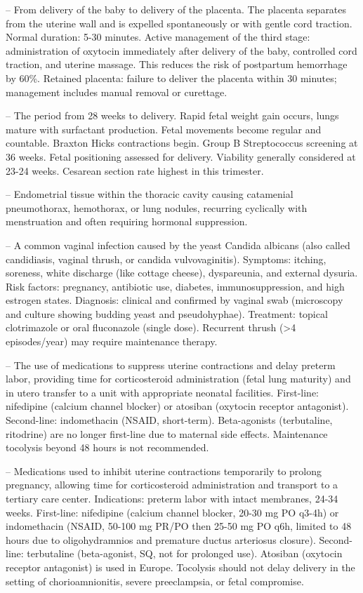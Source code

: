 -- From delivery of the baby to delivery of the placenta. The placenta separates from the uterine wall and is expelled spontaneously or with gentle cord traction. Normal duration: 5-30 minutes. Active management of the third stage: administration of oxytocin immediately after delivery of the baby, controlled cord traction, and uterine massage. This reduces the risk of postpartum hemorrhage by 60\%. Retained placenta: failure to deliver the placenta within 30 minutes; management includes manual removal or curettage.

-- The period from 28 weeks to delivery. Rapid fetal weight gain occurs, lungs mature with surfactant production. Fetal movements become regular and countable. Braxton Hicks contractions begin. Group B Streptococcus screening at 36 weeks. Fetal positioning assessed for delivery. Viability generally considered at 23-24 weeks. Cesarean section rate highest in this trimester.

-- Endometrial tissue within the thoracic cavity causing catamenial pneumothorax, hemothorax, or lung nodules, recurring cyclically with menstruation and often requiring hormonal suppression.

-- A common vaginal infection caused by the yeast Candida albicans (also called candidiasis, vaginal thrush, or candida vulvovaginitis). Symptoms: itching, soreness, white discharge (like cottage cheese), dyspareunia, and external dysuria. Risk factors: pregnancy, antibiotic use, diabetes, immunosuppression, and high estrogen states. Diagnosis: clinical and confirmed by vaginal swab (microscopy and culture showing budding yeast and pseudohyphae). Treatment: topical clotrimazole or oral fluconazole (single dose). Recurrent thrush (>4 episodes/year) may require maintenance therapy.

-- The use of medications to suppress uterine contractions and delay preterm labor, providing time for corticosteroid administration (fetal lung maturity) and in utero transfer to a unit with appropriate neonatal facilities. First-line: nifedipine (calcium channel blocker) or atosiban (oxytocin receptor antagonist). Second-line: indomethacin (NSAID, short-term). Beta-agonists (terbutaline, ritodrine) are no longer first-line due to maternal side effects. Maintenance tocolysis beyond 48 hours is not recommended.

-- Medications used to inhibit uterine contractions temporarily to prolong pregnancy, allowing time for corticosteroid administration and transport to a tertiary care center. Indications: preterm labor with intact membranes, 24-34 weeks. First-line: nifedipine (calcium channel blocker, 20-30 mg PO q3-4h) or indomethacin (NSAID, 50-100 mg PR/PO then 25-50 mg PO q6h, limited to 48 hours due to oligohydramnios and premature ductus arteriosus closure). Second-line: terbutaline (beta-agonist, SQ, not for prolonged use). Atosiban (oxytocin receptor antagonist) is used in Europe. Tocolysis should not delay delivery in the setting of chorioamnionitis, severe preeclampsia, or fetal compromise.

